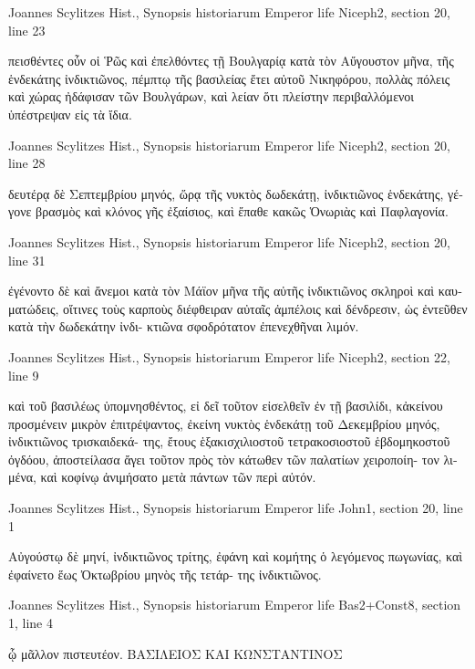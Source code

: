 \documentclass[12pt,letterpaper,twoside,final]{memoir}
\begin{document}
\begin{greek}
Joannes Scylitzes Hist., Synopsis historiarum 
Emperor life Niceph2, section 20, line 23

πεισθέντες οὖν οἱ Ῥῶς καὶ ἐπελθόντες τῇ Βουλγαρίᾳ κατὰ τὸν Αὔγουστον 
μῆνα, τῆς ἑνδεκάτης ἰνδικτιῶνος, πέμπτῳ τῆς βασιλείας ἔτει αὐτοῦ 
Νικηφόρου, πολλὰς πόλεις καὶ χώρας ἠδάφισαν τῶν Βουλγάρων, καὶ 
λείαν ὅτι πλείστην περιβαλλόμενοι ὑπέστρεψαν εἰς τὰ ἴδια. 



Joannes Scylitzes Hist., Synopsis historiarum 
Emperor life Niceph2, section 20, line 28

                                                                         δευτέρᾳ 
δὲ Σεπτεμβρίου μηνός, ὥρᾳ τῆς νυκτὸς δωδεκάτῃ, ἰνδικτιῶνος ἑνδεκάτης, 
γέγονε βρασμὸς καὶ κλόνος γῆς ἐξαίσιος, καὶ ἔπαθε κακῶς Ὁνωριὰς καὶ 
Παφλαγονία. 



Joannes Scylitzes Hist., Synopsis historiarum 
Emperor life Niceph2, section 20, line 31

              ἐγένοντο δὲ καὶ ἄνεμοι κατὰ τὸν Μάϊον μῆνα τῆς αὐτῆς 
ἰνδικτιῶνος σκληροὶ καὶ καυματώδεις, οἵτινες τοὺς καρποὺς διέφθειραν 
αὐταῖς ἀμπέλοις καὶ δένδρεσιν, ὡς ἐντεῦθεν κατὰ τὴν δωδεκάτην ἰνδι-
κτιῶνα σφοδρότατον ἐπενεχθῆναι λιμόν. 



Joannes Scylitzes Hist., Synopsis historiarum 
Emperor life Niceph2, section 22, line 9

                            καὶ τοῦ βασιλέως ὑπομνησθέντος, εἰ δεῖ τοῦτον 
εἰσελθεῖν ἐν τῇ βασιλίδι, κἀκείνου προσμένειν μικρὸν ἐπιτρέψαντος, 
ἐκείνη νυκτὸς ἑνδεκάτῃ τοῦ Δεκεμβρίου μηνός, ἰνδικτιῶνος τρισκαιδεκά-
της, ἔτους ἑξακισχιλιοστοῦ τετρακοσιοστοῦ ἑβδομηκοστοῦ ὀγδόου, 
ἀποστείλασα ἄγει τοῦτον πρὸς τὸν κάτωθεν τῶν παλατίων χειροποίη-
τον λιμένα, καὶ κοφίνῳ ἀνιμήσατο μετὰ πάντων τῶν περὶ αὐτόν. 



Joannes Scylitzes Hist., Synopsis historiarum 
Emperor life John1, section 20, line 1

Αὐγούστῳ δὲ μηνί, ἰνδικτιῶνος τρίτης, ἐφάνη καὶ κομήτης ὁ 
λεγόμενος πωγωνίας, καὶ ἐφαίνετο ἕως Ὀκτωβρίου μηνὸς τῆς τετάρ-
της ἰνδικτιῶνος. 



Joannes Scylitzes Hist., Synopsis historiarum 
Emperor life Bas2+Const8, section 1, line 4

                                                                                                ᾧ 
μᾶλλον πιστευτέον.   
ΒΑΣΙΛΕΙΟΣ ΚΑΙ ΚΩΝΣΤΑΝΤΙΝΟΣ



\end{greek}
\end{document}
